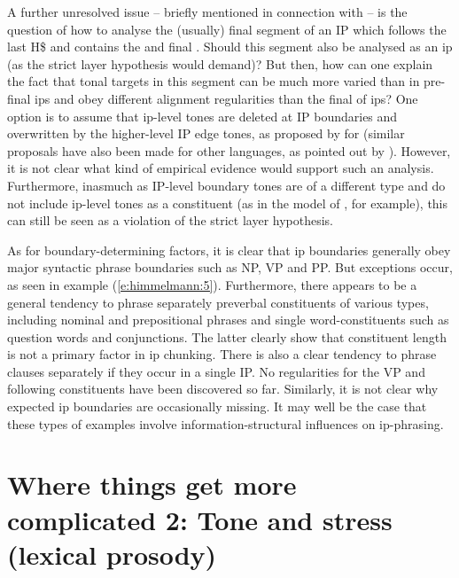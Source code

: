\documentclass[output=paper
,modfonts
,nonflat]{langsci/langscibook}
\begin{document}
A further unresolved issue – briefly mentioned in connection with  – is the question of how to analyse the (usually) final segment of an IP which follows the last H\$ and contains the  and final . Should this segment also be analysed as an ip (as the strict layer hypothesis \citealt{Selkirk1984} would demand)? But then, how can one explain the fact that tonal targets in this segment can be much more varied than in pre-final ips and obey different alignment regularities than the final  of ips? One option is to assume that ip-level tones are deleted at IP boundaries and overwritten by the higher-level IP edge tones, as proposed by \citet[83]{Khan2014} for  (similar proposals have also been made for other languages, as pointed out by \citealt{Khan2014}). However, it is not clear what kind of empirical evidence would support such an analysis. Furthermore, inasmuch as IP-level boundary tones are of a different type and do not include ip-level tones as a constituent (as in the model of \citealt{Beckman1986}, for example), this can still be seen as a violation of the strict layer hypothesis.

As for boundary-determining factors, it is clear that ip boundaries generally obey major syntactic phrase boundaries such as NP, VP and PP. But exceptions occur, as seen in example (\ref{e:himmelmann:5}). Furthermore, there appears to be a general tendency to phrase separately preverbal constituents of various types, including nominal and prepositional phrases and single word-constituents such as question words and conjunctions. The latter clearly show that constituent length is not a primary factor in ip chunking. There is also a clear tendency to phrase clauses separately if they occur in a single IP. No regularities for the VP and following constituents have been discovered so far. Similarly, it is not clear why expected ip boundaries are occasionally missing. It may well be the case that these types of examples involve information-structural influences on ip-phrasing.

\section{\label{s:himmelmann:5}Where things get more complicated 2: Tone and stress (lexical prosody)}
\end{document}
